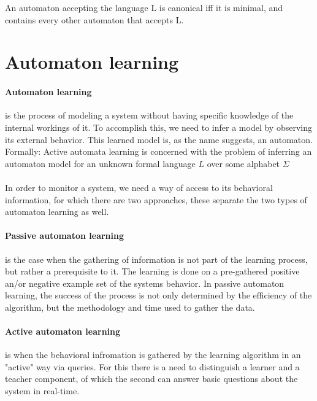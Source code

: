 \begin{definition}
	An automaton accepting the language L is canonical iff it is minimal, and contains every other automaton that accepts L.
\end{definition}

\section{Automaton learning}



\paragraph{Automaton learning}  is the process of modeling a system without having specific knowledge of the internal workings of it. To accomplish this, we need to infer a model by observing its external behavior. This learned model is, as the name suggests, an automaton. 
\\Formally: Active  automata  learning is  concerned  with  the  problem  of  inferring  an automaton model for an unknown formal language $L$ over some alphabet $\Sigma$\cite{Howar2018}
\\\\In order to monitor a system, we need a way of access to its behavioral information, for which there are two approaches, these separate the two types of automaton learning as well.

\paragraph{Passive automaton learning} is the case when the gathering of information is not part of the learning process, but rather a prerequisite to it. The learning is done on a pre-gathered positive an/or negative example set of the systems behavior. In passive automaton learning, the success of the process is not only determined by the efficiency of the algorithm, but the methodology and time used to gather the data.

\paragraph{Active automaton learning} is when the behavioral infromation is gathered by the learning algorithm in an "active" way via queries. For this there is a need to distinguish a learner and a teacher component, of which the second can answer basic questions about the system in real-time. 



